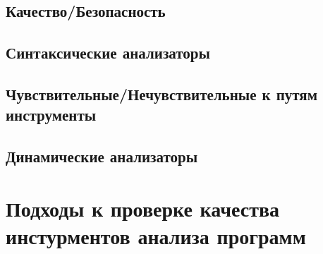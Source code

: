 \subsection{Качество/Безопасность}

\subsection{Синтаксические анализаторы}

\subsection{Чувствительные/Нечувствительные к путям инструменты}

\subsection{Динамические анализаторы}

\section{Подходы к проверке качества инстурментов анализа программ}

\FloatBarrier
